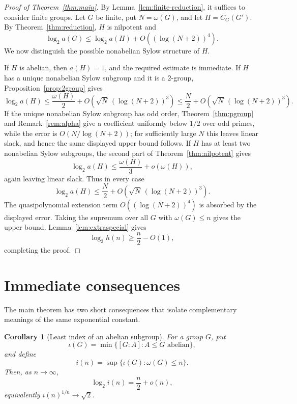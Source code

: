\documentclass[11pt]{article}
\newtheorem{corollary}[theorem]{Corollary}
\theoremstyle{definition}
\theoremstyle{remark}
\begin{document}
\begin{proof}[Proof of Theorem~\ref{thm:main}]
By Lemma~\ref{lem:finite-reduction}, it suffices to consider finite groups. Let $G$ be finite, put $N=\omega(G)$, and let $H=C_G(G')$. By Theorem~\ref{thm:reduction}, $H$ is nilpotent and
\[
\log_2a(G)\le\log_2a(H)+O((\log(N+2))^4).
\]
We now distinguish the possible nonabelian Sylow structure of $H$.

If $H$ is abelian, then $a(H)=1$, and the required estimate is immediate. If $H$ has a unique nonabelian Sylow subgroup and it is a $2$-group, Proposition~\ref{prop:2group} gives
\[
\log_2a(H)\le\frac{\omega(H)}2+O\!\left(\sqrt N\,(\log(N+2))^3\right)
\le\frac N2+O\!\left(\sqrt N\,(\log(N+2))^3\right).
\]
If the unique nonabelian Sylow subgroup has odd order, Theorem~\ref{thm:pgroup} and Remark~\ref{rem:alpha} give a coefficient uniformly below $1/2$ over odd primes, while the error is $O(N/\log(N+2))$; for sufficiently large $N$ this leaves linear slack, and hence the same displayed upper bound follows. If $H$ has at least two nonabelian Sylow subgroups, the second part of Theorem~\ref{thm:nilpotent} gives
\[
\log_2a(H)\le\frac{\omega(H)}3+o(\omega(H)),
\]
again leaving linear slack. Thus in every case
\[
\log_2a(H)\le\frac N2+O\!\left(\sqrt N\,(\log(N+2))^3\right).
\]
The quasipolynomial extension term $O((\log(N+2))^4)$ is absorbed by the displayed error. Taking the supremum over all $G$ with $\omega(G)\le n$ gives the upper bound. Lemma~\ref{lem:extraspecial} gives
\[
\log_2h(n)\ge\frac n2-O(1),
\]
completing the proof.
\end{proof}

\section{Immediate consequences}

The main theorem has two short consequences that isolate complementary meanings of the same exponential constant.

\begin{corollary}[Least index of an abelian subgroup]\label{cor:index}
For a group $G$, put
\[
\iota(G)=\min\{[G:A]:A\le G\text{ abelian}\},
\]
and define
\[
i(n)=\sup\{\iota(G):\omega(G)\le n\}.
\]
Then, as $n\to\infty$,
\[
\log_2i(n)=\frac n2+o(n),
\]
equivalently $i(n)^{1/n}\to\sqrt2$.
\end{corollary}
\end{document}
